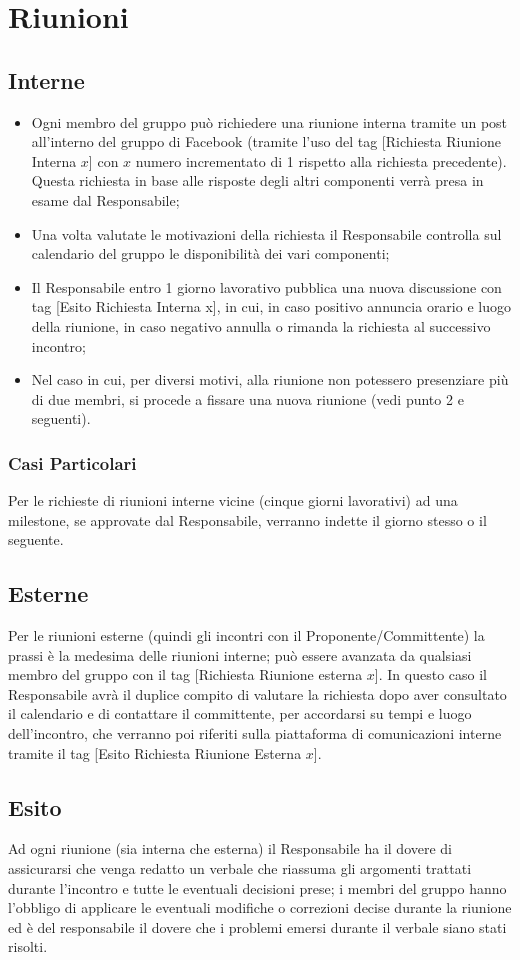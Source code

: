 \section{Riunioni}
	\subsection{Interne}{
		\begin{itemize}
			\item Ogni membro del gruppo pu\`{o} richiedere una riunione interna tramite un post all’interno del gruppo di Facebook (tramite l’uso del tag [Richiesta Riunione Interna $x$] con $x$ numero incrementato di 1 rispetto alla richiesta precedente). Questa richiesta  in base alle risposte degli altri componenti verr\`{a} presa in esame dal Responsabile;
			\item Una volta valutate le motivazioni della richiesta il Responsabile controlla sul calendario del gruppo le disponibilit\`{a} dei vari componenti;
			\item Il Responsabile entro 1 giorno lavorativo pubblica una nuova discussione con tag [Esito Richiesta Interna x], in cui, in caso positivo annuncia orario e luogo della riunione, in caso negativo annulla o rimanda la richiesta al successivo incontro;
			\item Nel caso in cui, per diversi motivi, alla riunione non potessero presenziare pi\`{u} di due membri, si procede a fissare una nuova riunione (vedi punto 2 e seguenti).
		\end{itemize}
		\subsubsection{Casi Particolari}{
			Per le richieste di riunioni interne vicine (cinque giorni lavorativi) ad una milestone, se approvate dal Responsabile, verranno indette il giorno stesso o il seguente.
		}
	}
	\subsection{Esterne}{
		Per le riunioni esterne (quindi gli incontri con il Proponente/Committente) la prassi \`{e} la medesima delle riunioni interne; pu\`{o} essere avanzata da qualsiasi membro del gruppo con il tag [Richiesta Riunione esterna $x$].
		In questo caso il Responsabile avr\`{a} il duplice compito di valutare la richiesta dopo aver consultato il calendario e di contattare  il committente, per accordarsi su tempi e luogo dell’incontro, che verranno poi riferiti sulla piattaforma di comunicazioni interne tramite il tag [Esito Richiesta Riunione Esterna $x$].
		}
	\subsection{Esito}{
		Ad ogni riunione (sia interna che esterna) il Responsabile ha il dovere di assicurarsi che venga redatto un verbale che riassuma gli argomenti trattati durante l’incontro e tutte le eventuali decisioni prese; i membri del gruppo hanno l’obbligo di applicare le eventuali modifiche o correzioni decise durante la riunione ed \`{e} del responsabile il dovere che i problemi emersi durante il verbale siano stati risolti.
		}
